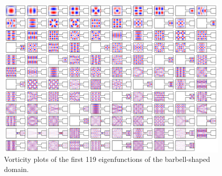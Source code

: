 \begin{figure}
  \centering
  \includegraphics[width=\textwidth]{barbell_gallery}
  \caption{Vorticity plots of the first 119 eigenfunctions
    of the barbell-shaped domain.}
  \label{fig:barbell_gallery}
\end{figure}

